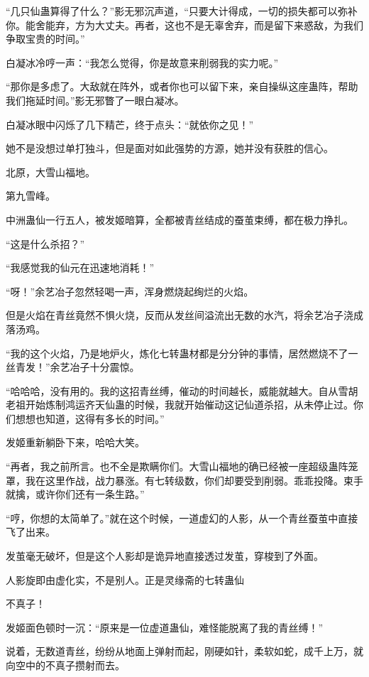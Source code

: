 
\begin{this_body}

“几只仙蛊算得了什么？”影无邪沉声道，“只要大计得成，一切的损失都可以弥补你。能舍能弃，方为大丈夫。再者，这也不是无辜舍弃，而是留下来惑敌，为我们争取宝贵的时间。”

白凝冰冷哼一声：“我怎么觉得，你是故意来削弱我的实力呢。”

“那你是多虑了。大敌就在阵外，或者你也可以留下来，亲自操纵这座蛊阵，帮助我们拖延时间。”影无邪瞥了一眼白凝冰。

白凝冰眼中闪烁了几下精芒，终于点头：“就依你之见！”

她不是没想过单打独斗，但是面对如此强势的方源，她并没有获胜的信心。

北原，大雪山福地。

第九雪峰。

中洲蛊仙一行五人，被发姬暗算，全都被青丝结成的蚕茧束缚，都在极力挣扎。

“这是什么杀招？”

“我感觉我的仙元在迅速地消耗！”

“呀！”余艺冶子忽然轻喝一声，浑身燃烧起绚烂的火焰。

但是火焰在青丝竟然不惧火烧，反而从发丝间溢流出无数的水汽，将余艺冶子浇成落汤鸡。

“我的这个火焰，乃是地炉火，炼化七转蛊材都是分分钟的事情，居然燃烧不了一丝青发！”余艺冶子十分震惊。

“哈哈哈，没有用的。我的这招青丝缚，催动的时间越长，威能就越大。自从雪胡老祖开始炼制鸿运齐天仙蛊的时候，我就开始催动这记仙道杀招，从未停止过。你们想想也知道，这得有多长的时间。”

发姬重新躺卧下来，哈哈大笑。

“再者，我之前所言。也不全是欺瞒你们。大雪山福地的确已经被一座超级蛊阵笼罩，我在这里作战，战力暴涨。有七转级数，你们却要受到削弱。乖乖投降。束手就擒，或许你们还有一条生路。”

“哼，你想的太简单了。”就在这个时候，一道虚幻的人影，从一个青丝蚕茧中直接飞了出来。

发茧毫无破坏，但是这个人影却是诡异地直接透过发茧，穿梭到了外面。

人影旋即由虚化实，不是别人。正是灵缘斋的七转蛊仙

不真子！

发姬面色顿时一沉：“原来是一位虚道蛊仙，难怪能脱离了我的青丝缚！”

说着，无数道青丝，纷纷从地面上弹射而起，刚硬如针，柔软如蛇，成千上万，就向空中的不真子攒射而去。


\end{this_body}
